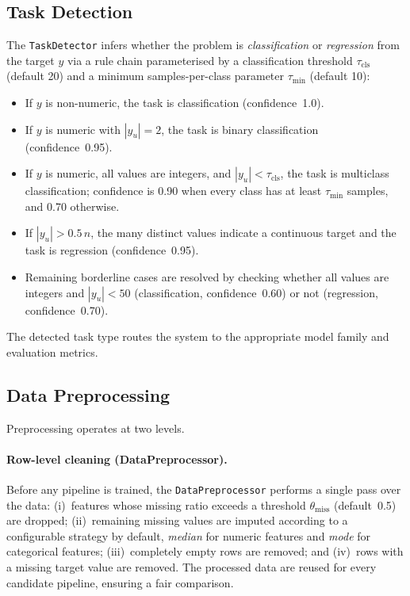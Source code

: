 \documentclass[conference]{IEEEtran}
\begin{document}
   \subsection{Task Detection}
   \label{sec:task_detection}

   The \texttt{TaskDetector} infers whether the problem is \emph{classification} or \emph{regression} from the target $y$ via a rule chain parameterised by a classification threshold $\tau_\text{cls}$ (default 20) and a minimum samples-per-class parameter $\tau_\text{min}$ (default 10):

   \begin{itemize}
   \item If $y$ is non-numeric, the task is classification (confidence~1.0).
   \item If $y$ is numeric with $|y_u|=2$, the task is binary classification (confidence~0.95).
   \item If $y$ is numeric, all values are integers, and $|y_u| < \tau_\text{cls}$, the task is multiclass classification; confidence is 0.90 when every class has at least $\tau_\text{min}$ samples, and 0.70 otherwise.
   \item If $|y_u| > 0.5\,n$, the many distinct values indicate a continuous target and the task is regression (confidence~0.95).
   \item Remaining borderline cases are resolved by checking whether all values are integers and $|y_u| < 50$ (classification, confidence~0.60) or not (regression, confidence~0.70).
   \end{itemize}

   The detected task type routes the system to the appropriate model family and evaluation metrics.

   \subsection{Data Preprocessing}
   \label{sec:preprocessing}

   Preprocessing operates at two levels.

   \paragraph{Row-level cleaning (DataPreprocessor).}
   Before any pipeline is trained, the \texttt{DataPreprocessor} performs a single pass over the data:
   (i)~features whose missing ratio exceeds a threshold $\theta_\text{miss}$ (default~0.5) are dropped;
   (ii)~remaining missing values are imputed according to a configurable strategy by default, \emph{median} for numeric features and \emph{mode} for categorical features;
   (iii)~completely empty rows are removed; and
   (iv)~rows with a missing target value are removed.
   The processed data are reused for every candidate pipeline, ensuring a fair comparison.
\end{document}
